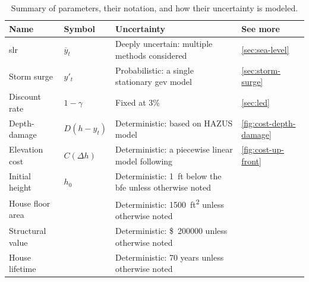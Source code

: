 \documentclass[12pt]{article}
\newcommand{\usd}[1]{\SI{#1}[\$]{}}
\begin{document}
\begin{table}
    \centering
    \caption{
        Summary of parameters, their notation, and how their uncertainty is modeled.
    }\label{tab:uncertainties}
    \begin{tabular}{l l p{3in} l}
        \toprule
        Name             & Symbol           & Uncertainty                                                                          & See more                     \\
        \midrule
        \Gls{slr}        & $\overline{y}_t$ & Deeply uncertain: multiple methods considered                                        & \cref{sec:sea-level}         \\
        Storm surge      & $y'_t$           & Probabilistic: a single stationary \acrshort{gev} model                              & \cref{sec:storm-surge}       \\
        Discount rate    & $1-\gamma$       & Fixed at 3\%                                                                         & \cref{sec:led}               \\
        Depth-damage     & $D(h-y_t)$       & Deterministic: based on HAZUS model                                                  & \cref{fig:cost-depth-damage} \\
        Elevation cost   & $C(\Delta h)$    & Deterministic: a piecewise linear model following \citet{zarekarizi_suboptimal:2020} & \cref{fig:cost-up-front}     \\
        Initial height   & $h_0$            & Deterministic: \SI{1}{ft} below the \gls{bfe} unless otherwise noted                 &                              \\
        House floor area &                  & Deterministic: \SI{1500}{ft^2} unless otherwise noted                                &                              \\
        Structural value &                  & Deterministic: \usd{200000} unless otherwise noted                                   &                              \\
        House lifetime   &                  & Deterministic: 70 years unless otherwise noted                                       &                              \\
        \bottomrule
    \end{tabular}
\end{table}
\end{document}
